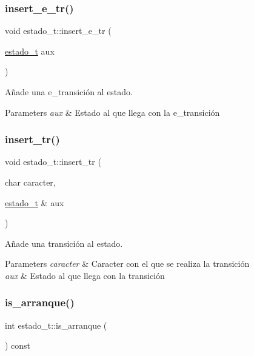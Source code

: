 \subsubsection{\texorpdfstring{insert\+\_\+e\+\_\+tr()}{insert\_e\_tr()}}
{\footnotesize\ttfamily void estado\+\_\+t\+::insert\+\_\+e\+\_\+tr (\begin{DoxyParamCaption}\item[{\hyperlink{classestado__t}{estado\+\_\+t}}]{aux }\end{DoxyParamCaption})}



Añade una e\+\_\+transición al estado. 


\begin{DoxyParams}{Parameters}
{\em aux} & Estado al que llega con la e\+\_\+transición \\
\hline
\end{DoxyParams}
\mbox{\label{classestado__t_a42ac67d9addaed274e82253476d90e52}} 
\subsubsection{\texorpdfstring{insert\+\_\+tr()}{insert\_tr()}}
{\footnotesize\ttfamily void estado\+\_\+t\+::insert\+\_\+tr (\begin{DoxyParamCaption}\item[{char}]{caracter,  }\item[{\hyperlink{classestado__t}{estado\+\_\+t} \&}]{aux }\end{DoxyParamCaption})}



Añade una transición al estado. 


\begin{DoxyParams}{Parameters}
{\em caracter} & Caracter con el que se realiza la transición \\
\hline
{\em aux} & Estado al que llega con la transición \\
\hline
\end{DoxyParams}
\mbox{\label{classestado__t_ac4d9e27de9fa01d3df4e4890f93d2d44}} 
\subsubsection{\texorpdfstring{is\+\_\+arranque()}{is\_arranque()}}
{\footnotesize\ttfamily int estado\+\_\+t\+::is\+\_\+arranque (\begin{DoxyParamCaption}{ }\end{DoxyParamCaption}) const\hspace{0.3cm}{\ttfamily [inline]}}




